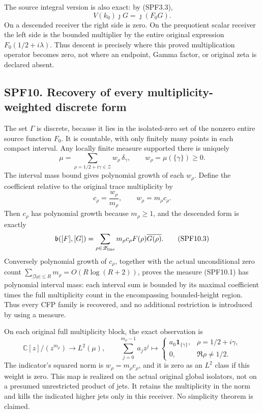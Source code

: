 The source integral version is also exact: by (SPF3.3), \[
V(k_0)\jmath G=\jmath(F_0G).
\tag{SPF9.2}
\] On a descended receiver the right side is zero. On the prequotient
scalar receiver the left side is the bounded multiplier by the entire
original expression \(F_0(1/2+i\lambda)\). Thus descent is precisely
where this proved multiplication operator becomes zero, not where an
endpoint, Gamma factor, or original zeta is declared absent.

\subsection{SPF10. Recovery of every multiplicity-weighted discrete
form}\label{spf10.-recovery-of-every-multiplicity-weighted-discrete-form}

The set \(\Gamma\) is discrete, because it lies in the isolated-zero set
of the nonzero entire source function \(F_0\). It is countable, with
only finitely many points in each compact interval. Any locally finite
measure supported there is uniquely \[
\mu=\sum_{\rho=1/2+i\gamma\in\mathscr Z}
w_\rho\,\delta_\gamma,
\qquad w_\rho=\mu(\{\gamma\})\ge0.
\tag{SPF10.1}
\] The interval mass bound gives polynomial growth of each \(w_\rho\).
Define the coefficient relative to the original trace multiplicity by \[
c_\rho=\frac{w_\rho}{m_\rho},\qquad
w_\rho=m_\rho c_\rho.
\tag{SPF10.2}
\] Then \(c_\rho\) has polynomial growth because \(m_\rho\ge1\), and the
descended form is exactly \[
\mathfrak b([F],[G])=
\sum_{\rho\in\mathscr Z_{\rm line}}m_\rho c_\rho
F(\rho)\overline{G(\rho)}.
\tag{SPF10.3}
\] Conversely polynomial growth of \(c_\rho\), together with the actual
unconditional zero count \(\sum_{|\Im\rho|\le R}m_\rho=O(R\log(R+2))\),
proves the measure (SPF10.1) has polynomial interval mass: each interval
sum is bounded by its maximal coefficient times the full multiplicity
count in the encompassing bounded-height region. Thus every CFP family
is recovered, and no additional restriction is introduced by using a
measure.

On each original full multiplicity block, the exact observation is \[
\mathbb C[z]/(z^{m_\rho})\longrightarrow L^2(\mu),\qquad
\sum_{j=0}^{m_\rho-1}a_jz^j\longmapsto
\begin{cases}a_0\mathbf 1_{\{\gamma\}},&\rho=1/2+i\gamma,
\\0,&\Re\rho\ne1/2.
\end{cases}
\tag{SPF10.4}
\] The indicator's squared norm is \(w_\rho=m_\rho c_\rho\), and it is
zero as an \(L^2\) class if this weight is zero. This map is realized on
the actual original global isolators, not on a presumed unrestricted
product of jets. It retains the multiplicity in the norm and kills the
indicated higher jets only in this receiver. No simplicity theorem is
claimed.

